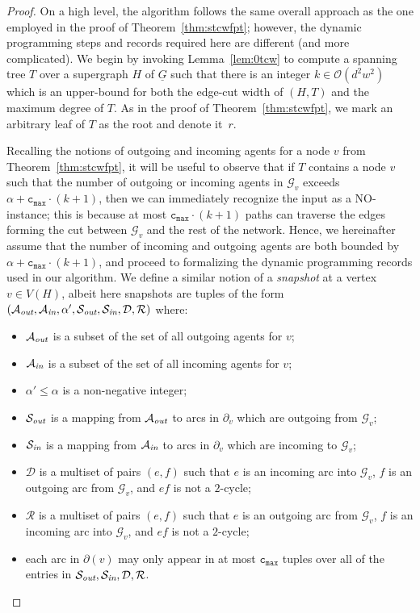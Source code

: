 \documentclass[letterpaper]{article} %
\newcommand{\bigoh}{\ensuremath{{\mathcal O}}}
\newcommand{\cmax}{\mathtt{c_{max}}}
\newcommand{\forgottenG}{\mathcal{G}}
\renewcommand{\R}{\mathcal{R}}
\renewcommand{\D}{\mathcal{D}}
\newcommand{\Sout}{\mathcal{S}_\emph{out}}
\newcommand{\Sin}{\mathcal{S}_\emph{in}}
\newcommand{\Aout}{\mathcal{A}_\emph{out}}
\newcommand{\Ain}{\mathcal{A}_\emph{in}}
\begin{document}
\begin{proof}
On a high level, the algorithm follows the same overall approach as the one employed in the proof of Theorem~\ref{thm:stcwfpt}; however, the dynamic programming steps and records required here are different (and more complicated). We begin by invoking Lemma~\ref{lem:0tcw} to compute a spanning tree $T$ over a supergraph $H$ of $\underline G$ such that there is an integer $k\in \bigoh(d^2w^2)$ which is an upper-bound for both the edge-cut width of $(H,T)$ and the maximum degree of $T$. As in the proof of Theorem~\ref{thm:stcwfpt}, we mark an arbitrary leaf of $T$ as the root and denote it~$r$.

Recalling the notions of outgoing and incoming agents for a node $v$ from Theorem~\ref{thm:stcwfpt}, it will be useful to observe that if $T$ contains a node $v$ such that the number of outgoing or incoming agents in $\forgottenG_v$ exceeds $\alpha+\cmax\cdot (k+1)$, then we can immediately recognize the input as a NO-instance; this is because at most $\cmax\cdot (k+1)$ paths can traverse the edges forming the cut between $\forgottenG_v$ and the rest of the network. Hence, we hereinafter assume that the number of incoming and outgoing agents are both bounded by $\alpha+\cmax\cdot (k+1)$, and proceed to formalizing the dynamic programming records used in our algorithm.
We define a similar notion of a \emph{snapshot} at a vertex $v\in V(H)$, albeit here snapshots are tuples of the form $(\Aout,\Ain,\alpha',\Sout,\Sin,\D,\R)$ where:
\begin{itemize}[topsep=0pt]
\item $\Aout$ is a subset of the set of all outgoing agents for $v$;
\item $\Ain$ is a subset of the set of all incoming agents for $v$;
\item $\alpha'\leq \alpha$ is a non-negative integer;
\item $\Sout$ is a mapping from $\Aout$ to arcs in $\partial_v$ which are outgoing from $\forgottenG_v$;
\item $\Sin$ is a mapping from $\Ain$ to arcs in $\partial_v$ which are incoming to $\forgottenG_v$;
\item $\D$ is a multiset of pairs $(e,f)$ such that $e$ is an incoming arc into $\forgottenG_v$, $f$ is an outgoing arc from $\forgottenG_v$, and $ef$ is not a $2$-cycle;
\item $\R$ is a multiset of pairs $(e,f)$ such that $e$ is an outgoing arc from $\forgottenG_v$, $f$ is an incoming arc into $\forgottenG_v$, and $ef$ is not a $2$-cycle;
\item each arc in $\partial(v)$ may only appear in at most $\cmax$ tuples over all of the entries in $\Sout, \Sin, \D, \R$.
\end{itemize}


\end{proof}
\end{document}
